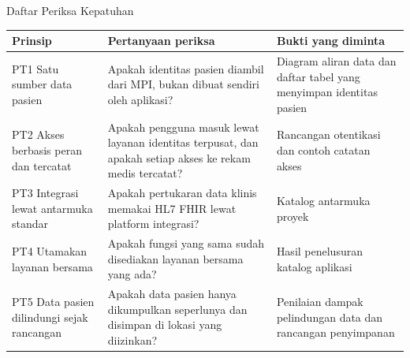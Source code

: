 \documentclass[aspectratio=169, table, 12pt]{beamer}
\begin{document}
\begin{frame}{{\Large Daftar Periksa Kepatuhan}}
  \scriptsize
  \begin{tabularx}{\textwidth}{L{2.9cm}YY}
    \hline
    \textbf{Prinsip} & \textbf{Pertanyaan periksa} & \textbf{Bukti yang diminta} \\
    \hline
    PT1 Satu sumber data pasien & Apakah identitas pasien diambil dari MPI,
      bukan dibuat sendiri oleh aplikasi? & Diagram aliran data dan daftar
      tabel yang menyimpan identitas pasien \\
    \hline
    PT2 Akses berbasis peran dan tercatat & Apakah pengguna masuk lewat
      layanan identitas terpusat, dan apakah setiap akses ke rekam medis
      tercatat? & Rancangan otentikasi dan contoh catatan akses \\
    \hline
    PT3 Integrasi lewat antarmuka standar & Apakah pertukaran data klinis
      memakai HL7 FHIR lewat platform integrasi? & Katalog antarmuka proyek \\
    \hline
    PT4 Utamakan layanan bersama & Apakah fungsi yang sama sudah disediakan
      layanan bersama yang ada? & Hasil penelusuran katalog aplikasi \\
    \hline
    PT5 Data pasien dilindungi sejak rancangan & Apakah data pasien hanya
      dikumpulkan seperlunya dan disimpan di lokasi yang diizinkan? &
      Penilaian dampak pelindungan data dan rancangan penyimpanan \\
    \hline
  \end{tabularx}
\end{frame}
\end{document}
